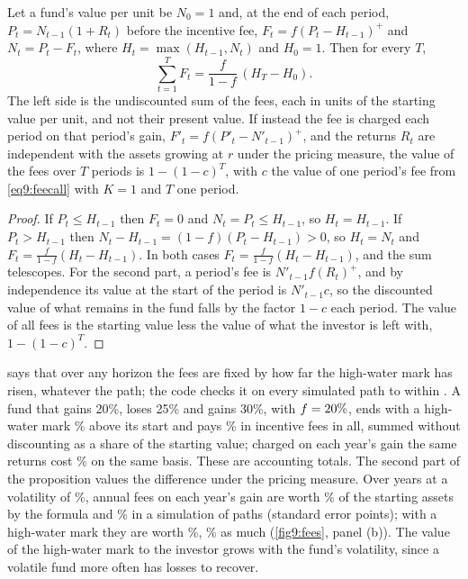 \begin{chapterrefs}
\begin{proposition}\label{prop9:hwm}
Let a fund's value per unit be $N_0=1$ and, at the end of each period, $P_t=N_{t-1}(1+R_t)$ before the
incentive fee, $F_t=f(P_t-H_{t-1})^+$ and $N_t=P_t-F_t$, where $H_t=\max(H_{t-1},N_t)$ and $H_0=1$. Then
for every $T$,
\begin{equation}\label{eq9:hwm}
  \sum_{t=1}^TF_t=\frac f{1-f}\,(H_T-H_0).
\end{equation}
The left side is the undiscounted sum of the fees, each in units of the starting value per unit,
and not their present value.
If instead the fee is charged each period on that period's gain, $F'_t=f(P'_t-N'_{t-1})^+$, and the
returns $R_t$ are independent with the assets growing at $r$ under the pricing measure, the value of
the fees over $T$ periods is $1-(1-c)^T$, with $c$ the value of one period's fee from \cref{eq9:feecall}
with $K=1$ and $T$ one period.
\end{proposition}

\begin{proof}
If $P_t\le H_{t-1}$ then $F_t=0$ and $N_t=P_t\le H_{t-1}$, so $H_t=H_{t-1}$. If $P_t>H_{t-1}$ then
$N_t-H_{t-1}=(1-f)(P_t-H_{t-1})>0$, so $H_t=N_t$ and $F_t=\frac f{1-f}(H_t-H_{t-1})$. In both cases
$F_t=\frac f{1-f}(H_t-H_{t-1})$, and the sum telescopes. For the second part, a period's fee is
$N'_{t-1}f(R_t)^+$, and by independence its value at the start of the period is $N'_{t-1}c$, so the
discounted value of what remains in the fund falls by the factor $1-c$ each period. The value of all
fees is the starting value less the value of what the investor is left with, $1-(1-c)^T$.
\end{proof}

 says that over any horizon the fees are fixed by how far the high-water mark has risen,
whatever the path; the code checks it on every simulated path to within \feIdGap. A fund that gains 20\%,
loses 25\% and gains 30\%, with $f=20\%$, ends with a high-water mark \feExMark\% above its start and pays
\feExFeeH\% in incentive fees in all, summed without discounting as a share of the starting value;
charged on each year's gain the same returns cost \feExFeeR\% on the same basis. These are accounting
totals. The second part of the proposition values the difference under the pricing measure. Over \feYears{} years at a volatility of \feTenVol\%,
annual fees on each year's gain are worth \feTenClosed\% of the starting assets by the formula and \feTenReset\%
in a simulation of \feSims{} paths (standard error \feTenResetSe{} points); with a high-water mark they are worth
\feTenHwm\%, \feTenRatio\% as much (\cref{fig9:fees}, panel (b)). The value of the high-water mark to the investor
grows with the fund's volatility, since a volatile fund more often has losses to recover.



\end{chapterrefs}
